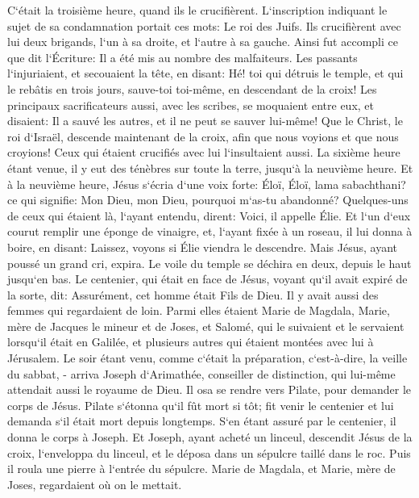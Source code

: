 \verse C`était la troisième heure, quand ils le crucifièrent. 
\verse L`inscription indiquant le sujet de sa condamnation portait ces mots: Le roi des Juifs. 
\verse Ils crucifièrent avec lui deux brigands, l`un à sa droite, et l`autre à sa gauche. 
\verse Ainsi fut accompli ce que dit l`Écriture: Il a été mis au nombre des malfaiteurs. 
\verse Les passants l`injuriaient, et secouaient la tête, en disant: Hé! toi qui détruis le temple, et qui le rebâtis en trois jours, 
\verse sauve-toi toi-même, en descendant de la croix! 
\verse Les principaux sacrificateurs aussi, avec les scribes, se moquaient entre eux, et disaient: Il a sauvé les autres, et il ne peut se sauver lui-même! 
\verse Que le Christ, le roi d`Israël, descende maintenant de la croix, afin que nous voyions et que nous croyions! Ceux qui étaient crucifiés avec lui l`insultaient aussi. 
\verse La sixième heure étant venue, il y eut des ténèbres sur toute la terre, jusqu`à la neuvième heure. 
\verse Et à la neuvième heure, Jésus s`écria d`une voix forte: Éloï, Éloï, lama sabachthani? ce qui signifie: Mon Dieu, mon Dieu, pourquoi m`as-tu abandonné? 
\verse Quelques-uns de ceux qui étaient là, l`ayant entendu, dirent: Voici, il appelle Élie. 
\verse Et l`un d`eux courut remplir une éponge de vinaigre, et, l`ayant fixée à un roseau, il lui donna à boire, en disant: Laissez, voyons si Élie viendra le descendre. 
\verse Mais Jésus, ayant poussé un grand cri, expira. 
\verse Le voile du temple se déchira en deux, depuis le haut jusqu`en bas. 
\verse Le centenier, qui était en face de Jésus, voyant qu`il avait expiré de la sorte, dit: Assurément, cet homme était Fils de Dieu. 
\verse Il y avait aussi des femmes qui regardaient de loin. Parmi elles étaient Marie de Magdala, Marie, mère de Jacques le mineur et de Joses, et Salomé, 
\verse qui le suivaient et le servaient lorsqu`il était en Galilée, et plusieurs autres qui étaient montées avec lui à Jérusalem. 
\verse Le soir étant venu, comme c`était la préparation, c`est-à-dire, la veille du sabbat, - 
\verse arriva Joseph d`Arimathée, conseiller de distinction, qui lui-même attendait aussi le royaume de Dieu. Il osa se rendre vers Pilate, pour demander le corps de Jésus. 
\verse Pilate s`étonna qu`il fût mort si tôt; fit venir le centenier et lui demanda s`il était mort depuis longtemps. 
\verse S`en étant assuré par le centenier, il donna le corps à Joseph. 
\verse Et Joseph, ayant acheté un linceul, descendit Jésus de la croix, l`enveloppa du linceul, et le déposa dans un sépulcre taillé dans le roc. Puis il roula une pierre à l`entrée du sépulcre. 
\verse Marie de Magdala, et Marie, mère de Joses, regardaient où on le mettait. 

